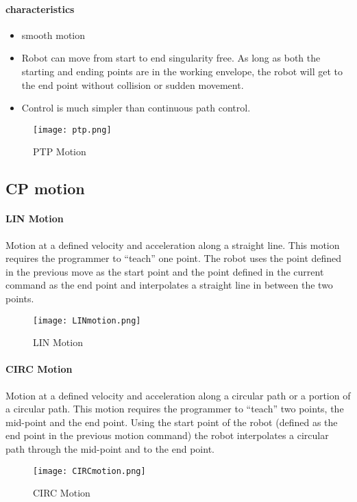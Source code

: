 	   \paragraph{characteristics}
	   \begin{itemize}
	   	\item smooth motion
	   	\item Robot can move from start to end singularity free. As long as both the starting and ending points are in the working envelope, the robot will get to the end point without collision or sudden movement. 
	   	\item	Control is much simpler than continuous path control. 
	   \end{itemize}
   \begin{figure}[H]
   	\caption{PTP Motion}
   	\centering
   	\texttt{[image: ptp.png]}
   \end{figure} 
 \subsection{CP motion}
 \paragraph{LIN Motion}
 Motion at a defined velocity and acceleration along a straight line.  This motion requires the programmer to “teach” one point.  The robot uses the point defined in the previous move as the start point and the point defined in the current command as the end point and interpolates a straight line in between the two points.
 \begin{figure}[H]
 	\centering
 	\texttt{[image: LINmotion.png]}
      	\caption{LIN Motion}
 \end{figure}

\paragraph{CIRC Motion}
Motion at a defined velocity and acceleration along a circular path or a portion of a circular path.  This motion requires the programmer to “teach” two points, the mid-point and the end point.  Using the start point of the robot (defined as the end point in the previous motion command) the robot interpolates a circular path through the mid-point and to the end point.
\begin{figure}[H]
	\centering
	\texttt{[image: CIRCmotion.png]}
    	\caption{CIRC Motion}
\end{figure} 

